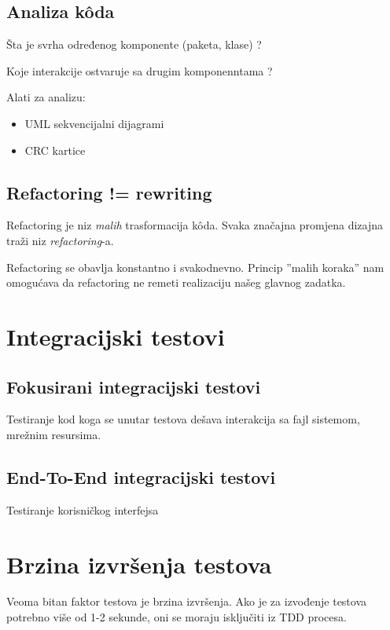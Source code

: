 \documentclass[times, utf8, seminar]{fit}
\begin{document}
\subsection{Analiza k\^oda}

Šta je svrha određenog komponente (paketa, klase) ?

Koje interakcije ostvaruje sa drugim komponenntama ?

Alati za analizu:
\begin{itemize}
  \item UML sekvencijalni dijagrami
  \item CRC kartice
\end{itemize}


\subsection{Refactoring != rewriting}

Refactoring je niz \emph{malih} trasformacija k\^oda.
Svaka značajna promjena dizajna traži niz \emph{refactoring}-a.

Refactoring se obavlja konstantno i svakodnevno. Princip ''malih koraka'' nam omogućava da refactoring ne remeti realizaciju našeg glavnog zadatka.

\section{Integracijski testovi}

\subsection{Fokusirani integracijski testovi}

Testiranje kod koga se unutar testova dešava interakcija sa fajl sistemom, mrežnim resursima.

\subsection{End-To-End integracijski testovi}

Testiranje korisničkog interfejsa

\section{Brzina izvršenja testova}

Veoma bitan faktor testova je brzina izvršenja. Ako je za izvođenje testova potrebno više od 1-2 sekunde, oni se moraju isključiti iz TDD procesa. 
\end{document}
